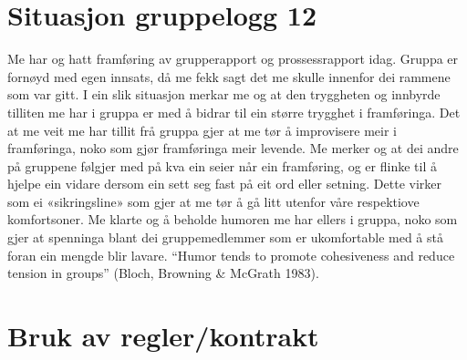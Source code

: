 \section{Situasjon gruppelogg 12}
Me har og hatt framføring av grupperapport og prossessrapport idag. Gruppa er fornøyd med egen innsats, då me fekk sagt det me skulle innenfor dei rammene som var gitt. I ein slik situasjon merkar me og at den tryggheten og innbyrde tilliten me har i gruppa er med å bidrar til ein større trygghet i framføringa. Det at me veit me har tillit frå gruppa gjer at me tør å improvisere meir i framføringa, noko som gjør framføringa meir levende. Me merker og at dei andre på gruppene følgjer med på kva ein seier når ein framføring, og er flinke til å hjelpe ein vidare dersom ein sett seg fast på eit ord eller setning. Dette virker som ei «sikringsline» som gjer at me tør å gå litt utenfor våre respektiove komfortsoner.  Me klarte og å beholde humoren me har ellers i gruppa, noko som gjer at spenninga blant dei gruppemedlemmer som er ukomfortable med å stå foran ein mengde blir lavare. ``Humor tends to promote cohesiveness and reduce tension in groups'' (Bloch, Browning \& McGrath 1983).


\section{Bruk av regler/kontrakt}

